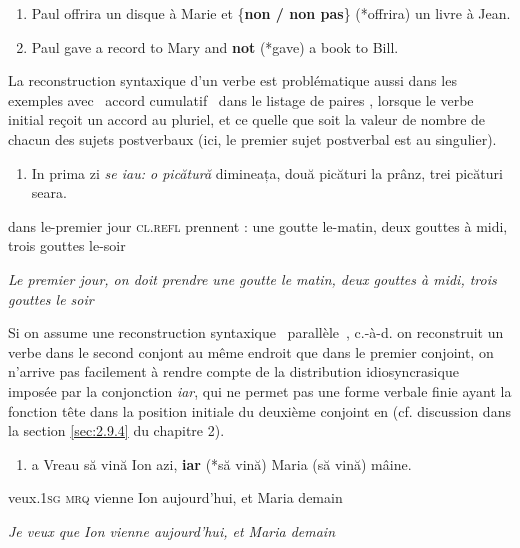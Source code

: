 \begin{enumerate}
\item \label{bkm:Ref290289841}Paul offrira un disque à Marie et \{\textbf{non / non pas}\} (*offrira) un livre à Jean. 

\item \label{bkm:Ref290289878}Paul gave a record to Mary and \textbf{not} (*gave) a book to Bill.


\end{enumerate}
La reconstruction syntaxique d'un verbe est problématique aussi dans les exemples avec {\guillemotleft}~accord cumulatif~{\guillemotright} dans le listage de paires , lorsque le verbe initial reçoit un accord au pluriel, et ce quelle que soit la valeur de nombre de chacun des sujets postverbaux (ici, le premier sujet postverbal est au singulier). 


\begin{enumerate}
\item \label{bkm:Ref290291007}In prima zi \emph{\textup{se iau}}\emph{\textup{: o picătură}} dimineața, două picături la prânz, trei picături seara.


\end{enumerate}
dans le-premier jour \textsc{cl.refl} prennent : une goutte le-matin, deux gouttes à midi, trois gouttes le-soir

{\itshape
Le premier jour, on doit prendre une goutte le matin, deux gouttes à midi, trois gouttes le soir}

Si on assume une reconstruction syntaxique {\guillemotleft}~parallèle~{\guillemotright}, c.-à-d. on reconstruit un verbe dans le second conjont au même endroit que dans le premier conjoint, on n'arrive pas facilement à rendre compte de la distribution idiosyncrasique imposée par la conjonction \textit{iar}, qui ne permet pas une forme verbale finie ayant la fonction tête dans la position initiale du deuxième conjoint en  (cf. discussion dans la section \ref{sec:2.9.4} du chapitre 2).


\begin{enumerate}
\item \label{bkm:Ref302393109}a  Vreau să vină Ion azi, \textbf{iar} (*să vină) Maria (să vină) mâine.


\end{enumerate}
veux.\textsc{1sg} \textsc{mrq} vienne Ion aujourd'hui, et Maria demain

{\itshape
Je veux que Ion vienne aujourd'hui, et Maria demain}

